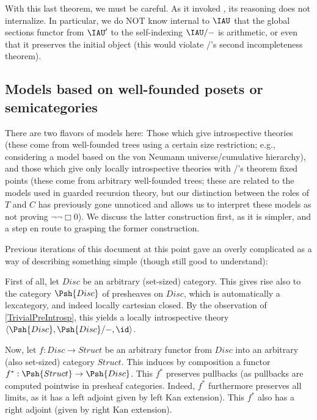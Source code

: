 With this last theorem, we must be careful. As it invoked , its reasoning does not internalize. In particular, we do NOT know internal to $\IAU$ that the global sections functor from $\IAU'$ to the self-indexing $\IAU/-$ is arithmetic, or even that it preserves the initial object (this would violate \Goedel/'s second incompleteness theorem).

\subsection{Models based on well-founded posets or semicategories}
There are two flavors of models here: Those which give introspective theories (these come from well-founded trees using a certain size restriction; e.g., considering a model based on the von Neumann universe/cumulative hierarchy), and those which give only locally introspective theories with \Loeb/'s theorem fixed points (these come from arbitrary well-founded trees; these are related to the models used in guarded recursion theory, but our distinction between the roles of $T$ and $C$ has previously gone unnoticed and allows us to interpret these models as not proving $\lnot \lnot \Box 0$). We discuss the latter construction first, as it is simpler, and a step en route to grasping the former construction.

Previous iterations of this document at this point gave an overly complicated as a way of describing something simple (though still good to understand):

First of all, let $Disc$ be an arbitrary (set-sized) category. This gives rise also to the category $\Psh{Disc}$ of presheaves on $Disc$, which is automatically a lexcategory, and indeed locally cartesian closed. By the observation of \cref{TrivialPreIntrosp}, this yields a locally introspective theory $\langle \Psh{Disc}, \Psh{Disc}/-, \id \rangle$.

Now, let $f : Disc \to Struct$ be an arbitrary functor from $Disc$ into an arbitrary (also set-sized) category $Struct$. This induces by composition a functor $f^* : \Psh{Struct} \to \Psh{Disc}$. This $f^*$ preserves pullbacks (as pullbacks are computed pointwise in presheaf categories. Indeed, $f^*$ furthermore preserves all limits, as it has a left adjoint given by left Kan extension). This $f^*$ also has a right adjoint (given by right Kan extension).


